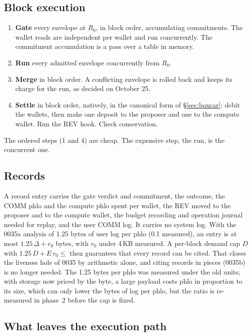 \documentclass[11pt]{article}
\newcommand{\code}{\path}
\begin{document}
\subsection{Block execution}

\begin{enumerate}
\item \textbf{Gate} every envelope at $R_0$, in block order, accumulating commitments. The wallet reads are independent per wallet and run concurrently. The commitment accumulation is a pass over a table in memory.
\item \textbf{Run} every admitted envelope concurrently from $R_0$.
\item \textbf{Merge} in block order. A conflicting envelope is rolled back and keeps its charge for the run, as decided on October 25.
\item \textbf{Settle} in block order, natively, in the canonical form of \S\ref{sec:boxcar}: debit the wallets, then make one deposit to the proposer and one to the compute wallet. Run the REV hook. Check conservation.
\end{enumerate}
The ordered steps (1 and 4) are cheap. The expensive step, the run, is the concurrent one.

\subsection{Records}

A record entry carries the gate verdict and commitment, the outcome, the COMM phlo and the compute phlo spent per wallet, the REV moved to the proposer and to the compute wallet, the budget recording and operation journal needed for replay, and the user COMM log. It carries no system log. With the 0035a analysis of 1.25 bytes of user log per phlo (0.1 measured), an entry is at most $1.25\,\Delta + r_0$ bytes, with $r_0$ under 4\,KB measured. A per-block demand cap $D$ with $1.25\,D + E\,r_0 \le$ \code{block-record-bytes} then guarantees that every record can be cited. That closes the liveness hole of 0035 by arithmetic alone, and citing records in pieces (0035b) is no longer needed. The 1.25 bytes per phlo was measured under the old units; with storage now priced by the byte, a large payload costs phlo in proportion to its size, which can only lower the bytes of log per phlo, but the ratio is re-measured in phase~2 before the cap is fixed.

\subsection{What leaves the execution path}
\end{document}
